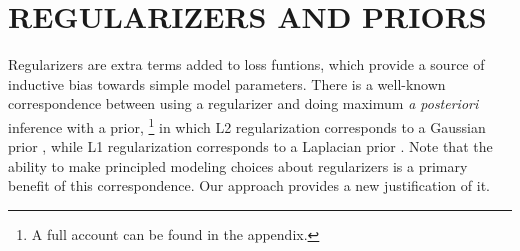 \documentclass[twoside]{article}
\theoremstyle{plain}
\theoremstyle{definition}
\begin{document}
\section{REGULARIZERS AND PRIORS}
\label{sec:regularizers}
Regularizers are extra terms added to loss funtions, which provide a source of inductive bias towards simple model parameters.
There is a well-known correspondence between using a regularizer and
doing maximum \emph{a posteriori} inference with a prior,%
\footnote{A full account can be found in the appendix.}
in which L2 regularization corresponds to a Gaussian prior
\parencite{rennie2003l2},
while L1 regularization corresponds to a Laplacian prior \parencite{williams1995bayesian}.
Note that the ability to make principled modeling choices about regularizers is a primary benefit of this correspondence.
Our approach provides a new justification of it.
\end{document}
